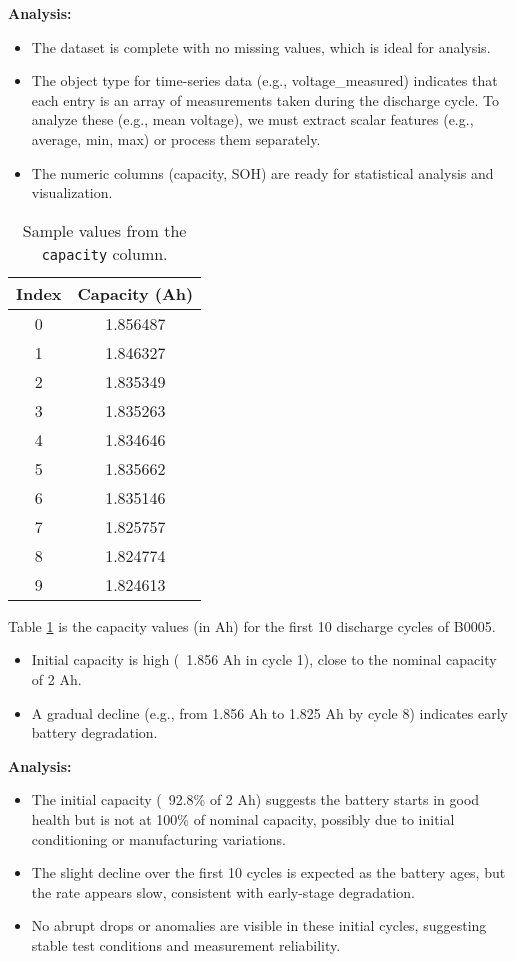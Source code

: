 \textbf{Analysis:}
\begin{itemize}
    \item The dataset is complete with no missing values, which is ideal for analysis.
    \item The object type for time-series data (e.g., voltage\_measured) indicates that each entry is an array of measurements taken during the discharge cycle. To analyze these (e.g., mean voltage), we must extract scalar features (e.g., average, min, max) or process them separately.
    \item The numeric columns (capacity, SOH) are ready for statistical analysis and visualization.
\end{itemize}

\begin{table}[h!]
\centering
\begin{tabular}{cc}
\toprule
\textbf{Index} & \textbf{Capacity (Ah)} \\
\midrule
0 & 1.856487 \\
1 & 1.846327 \\
2 & 1.835349 \\
3 & 1.835263 \\
4 & 1.834646 \\
5 & 1.835662 \\
6 & 1.835146 \\
7 & 1.825757 \\
8 & 1.824774 \\
9 & 1.824613 \\
\bottomrule
\end{tabular}
\caption{Sample values from the \texttt{capacity} column.}
\label{tab:capacity_sample}
\end{table}


Table \ref{tab:capacity_sample} is the capacity values (in Ah) for the first 10 discharge cycles of B0005.
\begin{itemize} 
    \item Initial capacity is high (~1.856 Ah in cycle 1), close to the nominal capacity of 2 Ah.
    \item A gradual decline (e.g., from 1.856 Ah to 1.825 Ah by cycle 8) indicates early battery degradation.
\end{itemize}

\textbf{Analysis:}
\begin{itemize}
    \item The initial capacity (~92.8\% of 2 Ah) suggests the battery starts in good health but is not at 100\% of nominal capacity, possibly due to initial conditioning or manufacturing variations.
    \item The slight decline over the first 10 cycles is expected as the battery ages, but the rate appears slow, consistent with early-stage degradation.
    \item No abrupt drops or anomalies are visible in these initial cycles, suggesting stable test conditions and measurement reliability.
\end{itemize}


